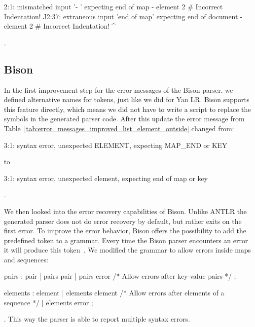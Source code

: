 \begin{textcode}
2:1: mismatched input '- ' expecting end of map
     - element 2 # Incorrect Indentation!
     ^^
2:37: extraneous input 'end of map' expecting end of document
      - element 2 # Incorrect Indentation!
                                          ^
\end{textcode}

.

\subsection{Bison}

In the first improvement step for the error messages of the Bison parser. we defined alternative names for tokens, just like we did for Yan LR. Bison supports this feature directly, which means we did not have to write a script to replace the symbols in the generated parser code. After this update the error message from Table~\ref{tab:error_messages_improved_list_element_outside} changed from:

\begin{textcode}
  3:1: syntax error, unexpected ELEMENT, expecting MAP_END or KEY
\end{textcode}

to

\begin{textcode}
  3:1: syntax error, unexpected element, expecting end of map or key
\end{textcode}

.

We then looked into the error recovery capabilities of Bison. Unlike ANTLR the generated parser does not do error recovery by default, but rather exits on the first error. To improve the error behavior, Bison offers the possibility to add the predefined  token to a grammar. Every time the Bison parser encounters an error it will produce this token~\cite{donnelly2019bison}. We modified the grammar to allow errors inside  maps and sequences:

\begin{ccode}
  pairs : pair
        | pairs pair
        | pairs error /* Allow errors after key-value pairs */
        ;

  elements : element
           | elements element
           /* Allow errors after elements of a sequence */
           | elements error
           ;
\end{ccode}

. This way the parser is able to report multiple syntax errors.

